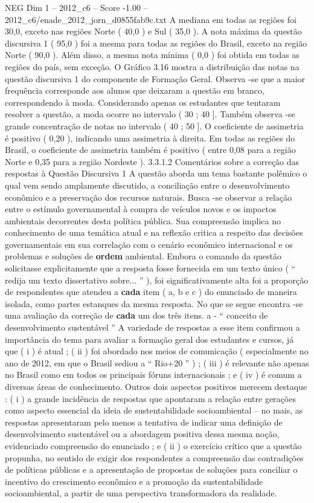 \begin{textsample}{NEG Dim 1 – 2012\_c6 – Score -1.00 – 2012\_c6/enade\_2012\_jorn\_d0855fab9c.txt}
A mediana em todas as regiões foi 30,0, exceto nas regiões Norte ( 40,0 ) e Sul ( 35,0 ).
A nota máxima da questão discursiva 1 ( 95,0 ) foi a mesma para todas as regiões do Brasil, exceto na região Norte ( 90,0 ).
Além disso, a mesma nota mínima ( 0,0 ) foi obtida em todas as regiões do país, sem exceção.
O Gráfico 3.16 mostra a distribuição das notas na questão discursiva 1 do componente de Formação Geral.
Observa -se que a maior frequência corresponde aos alunos que deixaram a questão em branco, correspondendo à moda.
Considerando apenas os estudantes que tentaram resolver a questão, a moda ocorre no intervalo ( 30 ; 40 ].
Também observa -se grande concentração de notas no intervalo ( 40 ; 50 ].
O coeficiente de assimetria é positivo ( 0,20 ), indicando uma assimetria à direita.
Em todas as regiões do Brasil, o coeficiente de assimetria também é positivo ( entre 0,08 para a região Norte e 0,35 para a região Nordeste ). 3.3.1.2 Comentários sobre a correção das respostas à Questão Discursiva 1 A questão aborda um tema bastante polêmico o qual vem sendo amplamente discutido, a conciliação entre o desenvolvimento econômico e a preservação dos recursos naturais.
Busca -se observar a relação entre o estímulo governamental à compra de veículos novos e os impactos ambientais decorrentes desta política pública.
Sua compreensão implica no conhecimento de uma temática atual e na reflexão critica a respeito das decisões governamentais em sua correlação com o cenário econômico internacional e os problemas e soluções de \textbf{ordem} ambiental.
Embora o comando da questão solicitasse explicitamente que a resposta fosse fornecida em um texto único ( “ redija um texto dissertativo sobre... ” ), foi significativamente alta foi a proporção de respondentes que atendeu a \textbf{cada} item ( a, b e c ) do enunciado de maneira isolada, como partes estanques da mesma resposta.
No que se segue encontra -se uma avaliação da correção de \textbf{cada} um dos três itens. a - “ conceito de desenvolvimento sustentável ” A variedade de respostas a esse item confirmou a importância do tema para avaliar a formação geral dos estudantes e cursos, já que ( i ) é atual ; ( ii ) foi abordado nos meios de comunicação ( especialmente no ano de 2012, em que o Brasil sediou a “ Rio+20 ” ) ; ( iii ) é relevante não apenas no Brasil como em todos os principais fóruns internacionais ; e ( iv ) é comum a diversas áreas de conhecimento.
Outros dois aspectos positivos merecem destaque : ( i ) a grande incidência de respostas que apontaram a relação entre gerações como aspecto essencial da ideia de sustentabilidade socioambiental – no mais, as respostas apresentaram pelo menos a tentativa de indicar uma definição de desenvolvimento sustentável ou a abordagem positiva dessa mesma noção, evidenciado compreensão do enunciado ; e ( ii ) o exercício crítico que a questão propunha, no sentido de exigir dos respondentes a compreensão das contradições de políticas públicas e a apresentação de propostas de soluções para conciliar o incentivo do crescimento econômico e a promoção da sustentabilidade socioambiental, a partir de uma perspectiva transformadora da realidade.

\end{textsample}

